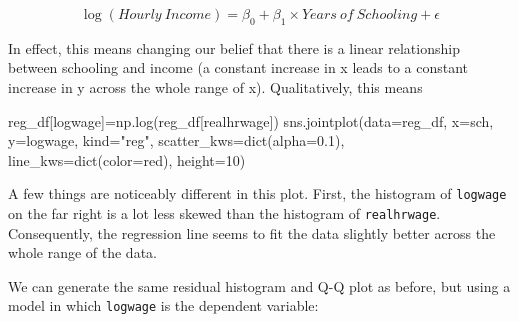 \documentclass[
  letterpaper,
  DIV=11,
  numbers=noendperiod]{scrreprt}
\newenvironment{Shaded}{\begin{snugshade}}{\end{snugshade}}
\newcommand{\BuiltInTok}[1]{\textcolor[rgb]{0.00,0.23,0.31}{#1}}
\newcommand{\DecValTok}[1]{\textcolor[rgb]{0.68,0.00,0.00}{#1}}
\newcommand{\FloatTok}[1]{\textcolor[rgb]{0.68,0.00,0.00}{#1}}
\newcommand{\NormalTok}[1]{\textcolor[rgb]{0.00,0.23,0.31}{#1}}
\newcommand{\OperatorTok}[1]{\textcolor[rgb]{0.37,0.37,0.37}{#1}}
\newcommand{\StringTok}[1]{\textcolor[rgb]{0.13,0.47,0.30}{#1}}
\begin{document}
\[\log{(Hourly\ Income)}= \beta_0 + \beta_1 \times Years\ of\ Schooling +\epsilon \]

In effect, this means changing our belief that there is a linear
relationship between schooling and income (a constant increase in x
leads to a constant increase in y across the whole range of x).
Qualitatively, this means

\begin{Shaded}
\begin{Highlighting}[]
\NormalTok{reg\_df[}\StringTok{\textquotesingle{}logwage\textquotesingle{}}\NormalTok{]}\OperatorTok{=}\NormalTok{np.log(reg\_df[}\StringTok{\textquotesingle{}realhrwage\textquotesingle{}}\NormalTok{])}
\NormalTok{sns.jointplot(data}\OperatorTok{=}\NormalTok{reg\_df, x}\OperatorTok{=}\StringTok{\textquotesingle{}sch\textquotesingle{}}\NormalTok{, y}\OperatorTok{=}\StringTok{\textquotesingle{}logwage\textquotesingle{}}\NormalTok{, kind}\OperatorTok{=}\StringTok{"reg"}\NormalTok{,  scatter\_kws}\OperatorTok{=}\BuiltInTok{dict}\NormalTok{(alpha}\OperatorTok{=}\FloatTok{0.1}\NormalTok{), line\_kws}\OperatorTok{=}\BuiltInTok{dict}\NormalTok{(color}\OperatorTok{=}\StringTok{\textquotesingle{}red\textquotesingle{}}\NormalTok{), height}\OperatorTok{=}\DecValTok{10}\NormalTok{)}
\end{Highlighting}
\end{Shaded}

A few things are noticeably different in this plot. First, the histogram
of \texttt{logwage} on the far right is a lot less skewed than the
histogram of \texttt{realhrwage}. Consequently, the regression line
seems to fit the data slightly better across the whole range of the
data.

We can generate the same residual histogram and Q-Q plot as before, but
using a model in which \texttt{logwage} is the dependent variable:
\end{document}
